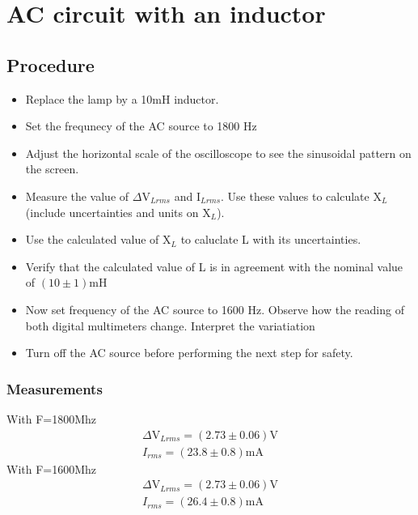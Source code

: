 \documentclass{report}
\begin{document}
\chapter{AC circuit with an inductor}

\section{Procedure}
\begin{itemize}
    \item Replace the lamp by a 10\si{\milli\henry} inductor.
    \item Set the frequnecy of the AC source to 1800 \si{\hertz}
    \item Adjust the horizontal scale of the oscilloscope to see the sinusoidal pattern on the screen.
    \item Measure the value of $\Delta\si{\volt}_{Lrms}$ and I$_{Lrms}$. Use these values to calculate X$_{L}$ (include uncertainties and units on X$_{L}$).
    \item Use the calculated value of X$_{L}$ to caluclate L with its uncertainties.
    \item Verify that the calculated value of L is in agreement with the nominal value of $(10\pm1)\si{\milli\henry}$
    \item Now set frequency of the AC source to 1600 \si{\hertz}. Observe how the reading of both digital multimeters change. Interpret the variatiation 
    \item Turn off the AC source before performing the next step for safety.
\end{itemize}
    

\subsection{Measurements}
With F=1800Mhz
\begin{gather}
    \Delta\si{\volt}_{Lrms}=(2.73\pm0.06)\si{\volt}\\ 
    I_{rms}=(23.8\pm0.8)\si{\milli\ampere}
\end{gather}
With F=1600Mhz
\begin{gather}
    \Delta\si{\volt}_{Lrms}=(2.73\pm0.06)\si{\volt}\\ 
    I_{rms}=(26.4\pm0.8)\si{\milli\ampere}
\end{gather}
\end{document}
